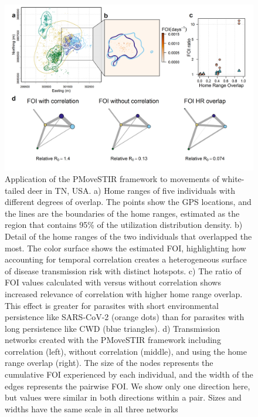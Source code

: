 \documentclass[letterpaper]{article}
\begin{document}
\begin{figure}
     \includegraphics[width=\textwidth]{figures/deer_results.png}
    \caption{Application of the PMoveSTIR framework to movements of white-tailed deer in TN, USA. a) Home ranges of five individuals with different degrees of overlap. The points show the GPS locations, and the lines are the boundaries of the home ranges, estimated as the region that contains 95\% of the utilization distribution density. b) Detail of the home ranges of the two individuals that overlapped the most. The color surface shows the estimated FOI, highlighting how accounting for temporal correlation creates a heterogeneous surface of disease transmission risk with distinct hotspots. c) The ratio of FOI values calculated with versus without correlation shows increased relevance of correlation with higher home range overlap. This effect is greater for parasites with short environmental persistence like SARS-CoV-2 (orange dots) than for parasites with long persistence like CWD (blue triangles). d) Transmission networks created with the PMoveSTIR framework including correlation (left), without correlation (middle), and using the home range overlap (right). The size of the nodes represents the cumulative FOI experienced by each individual, and the width of the edges represents the pairwise FOI. We show only one direction here, but values were similar in both directions within a pair. Sizes and widths have the same scale in all three networks}
	\label{fig:empiricalres}
\end{figure}

\clearpage


\end{document}
